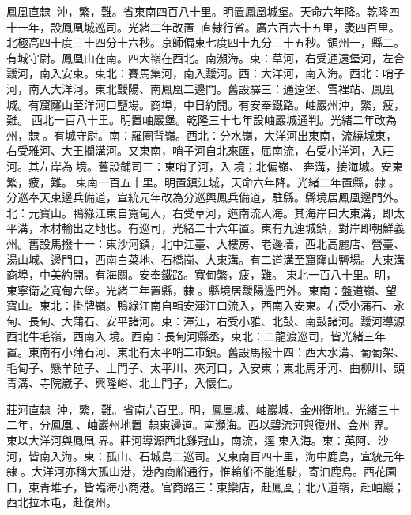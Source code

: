 \begin{pinyinscope}
鳳凰直隸：沖，繁，難。省東南四百八十里。明置鳳凰城堡。天命六年降。乾隆四十一年，設鳳凰城巡司。光緒二年改置，直隸行省。廣六百六十五里，袤四百里。北極高四十度三十四分十六秒。京師偏東七度四十九分三十五秒。領州一，縣二。有城守尉。鳳凰山在南。四大嶺在西北。南瀕海。東：草河，右受通遠堡河，左合靉河，南入安東。東北：賽馬集河，南入靉河。西：大洋河，南入海。西北：哨子河，南入大洋河。東北靉陽、南鳳凰二邊門。舊設驛三：通遠堡、雪裡站、鳳凰城。有窟窿山至洋河口鹽場。商埠，中日約開。有安奉鐵路。岫巖州沖，繁，疲，難。西北一百八十里。明置岫巖堡。乾隆三十七年設岫巖城通判。光緒二年改為州，隸。有城守尉。南：羅圈背嶺。西北：分水嶺，大洋河出東南，流繞城東，右受雅河、大王攔溝河。又東南，哨子河自北來匯，屈南流，右受小洋河，入莊河。其左岸為境。舊設鋪司三：東哨子河，入境；北偏嶺、奔溝，接海城。安東繁，疲，難。東南一百五十里。明置鎮江城，天命六年降。光緒二年置縣，隸。分巡奉天東邊兵備道，宣統元年改為分巡興鳳兵備道，駐縣。縣境居鳳凰邊門外。北：元寶山。鴨綠江東自寬甸入，右受草河，迤南流入海。其海岸曰大東溝，即太平溝，木材輸出之地也。有巡司，光緒二十六年置。東有九連城鎮，對岸即朝鮮義州。舊設馬撥十一：東沙河鎮，北中江臺、大樓房、老邊墻，西北高麗店、營臺、湯山城、邊門口，西南白菜地、石橋崗、大東溝。有二道溝至窟窿山鹽場。大東溝商埠，中美約開。有海關。安奉鐵路。寬甸繁，疲，難。東北一百八十里。明，東寧衛之寬甸六堡。光緒三年置縣，隸。縣境居靉陽邊門外。東南：盤道嶺、望寶山。東北：掛牌嶺。鴨綠江南自輯安渾江口流入，西南入安東。右受小蒲石、永甸、長甸、大蒲石、安平諸河。東：渾江，右受小雅、北鼓、南鼓諸河。靉河導源西北牛毛嶺，西南入境。西南：長甸河縣丞，東北：二龍渡巡司，皆光緒三年置。東南有小蒲石河、東北有太平哨二市鎮。舊設馬撥十四：西大水溝、葡萄架、毛甸子、懸羊砬子、土門子、太平川、夾河口，入安東；東北馬牙河、曲柳川、頭青溝、寺院崴子、興隆峪、北土門子，入懷仁。

莊河直隸：沖，繁，難。省南六百里。明，鳳凰城、岫巖城、金州衛地。光緒三十二年，分鳳凰、岫巖州地置，隸東邊道。南瀕海。西以碧流河與復州、金州界。東以大洋河與鳳凰界。莊河導源西北雞冠山，南流，逕東入海。東：英阿、沙河，皆南入海。東：孤山、石城島二巡司。又東南百四十里，海中鹿島，宣統元年隸。大洋河亦稱大孤山港，港內商船通行，惟輪船不能進駛，寄泊鹿島。西花園口，東青堆子，皆臨海小商港。官商路三：東欒店，赴鳳凰；北八道嶺，赴岫巖；西北拉木屯，赴復州。


\end{pinyinscope}
